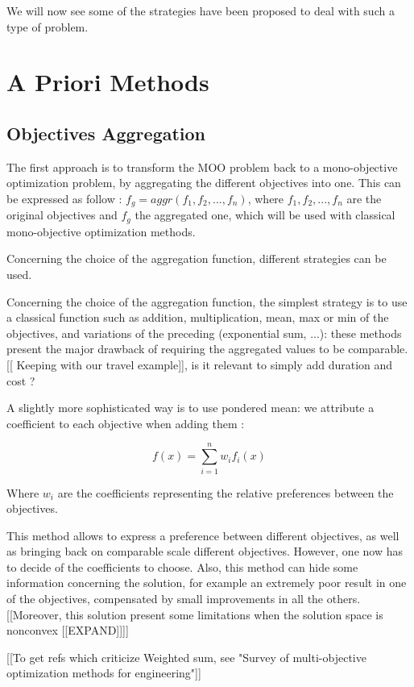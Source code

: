 We will now see some of the strategies have been proposed to deal with such a type of problem.

\section{A Priori Methods}

\subsection{Objectives Aggregation}

The first approach is to transform the MOO problem back to a mono-objective optimization problem, by aggregating the different objectives into one. This can be expressed as follow : \(f_g = aggr(f_1, f_2, ..., f_n)\), where \(f_1, f_2, ..., f_n\) are the original objectives and \(f_g\) the aggregated one, which will be used with classical mono-objective optimization methods.

Concerning the choice of the aggregation function, different strategies can be used.

Concerning the choice of the aggregation function, the simplest strategy is to use a classical function such as addition, multiplication, mean, max or min of the objectives, and variations of the preceding (exponential sum, ...): these methods present the major drawback of requiring the aggregated values to be comparable.[[ Keeping with our travel example]], is it relevant to simply add duration and cost ?

A slightly more sophisticated way is to use pondered mean: we attribute a coefficient to each objective when adding them :

\[ f(x) =\sum_{i=1}^n w_i f_i(x) \]

Where $w_i$ are the coefficients representing the relative preferences between the objectives.

This method allows to express a preference between different objectives, as well as bringing back on comparable scale different objectives. However, one now has to decide of the coefficients to choose. Also, this method can hide some information concerning the solution, for example an extremely poor result in one of the objectives, compensated by small improvements in all the others.  [[Moreover, this solution present some limitations when the solution space is nonconvex [[EXPAND]]]]

[[To get refs which criticize Weighted sum, see "Survey of multi-objective optimization methods for engineering"]]

